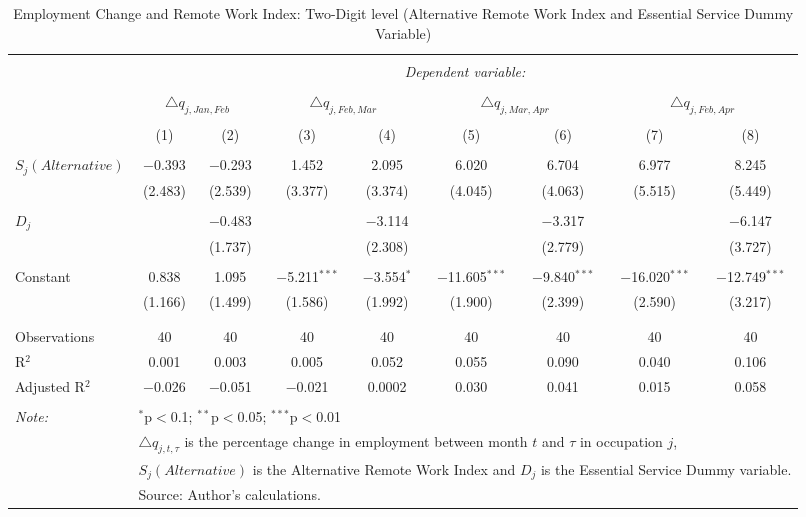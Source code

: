 
\begin{table}[!htbp] \centering 
  \caption{Employment Change and Remote Work Index: Two-Digit level (Alternative Remote Work Index and Essential Service Dummy Variable)} 
  \label{tab:regression_dynamics_2digit_alternative} 
\footnotesize 
\begin{tabular}{@{\extracolsep{5pt}}lcccccccc} 
\\[-1.8ex]\hline 
\hline \\[-1.8ex] 
 & \multicolumn{8}{c}{\textit{Dependent variable:}} \\ 
\cline{2-9} 
\\[-1.8ex] & \multicolumn{2}{c}{$\triangle q_{j,Jan,Feb}$} & \multicolumn{2}{c}{$\triangle q_{j,Feb,Mar}$} & \multicolumn{2}{c}{$\triangle q_{j,Mar,Apr}$} & \multicolumn{2}{c}{$\triangle q_{j,Feb,Apr}$} \\ 
\\[-1.8ex] & (1) & (2) & (3) & (4) & (5) & (6) & (7) & (8)\\ 
\hline \\[-1.8ex] 
 $S_{j} (Alternative)$ & $-$0.393 & $-$0.293 & 1.452 & 2.095 & 6.020 & 6.704 & 6.977 & 8.245 \\ 
  & (2.483) & (2.539) & (3.377) & (3.374) & (4.045) & (4.063) & (5.515) & (5.449) \\ 
  & & & & & & & & \\ 
 $D_{j}$ &  & $-$0.483 &  & $-$3.114 &  & $-$3.317 &  & $-$6.147 \\ 
  &  & (1.737) &  & (2.308) &  & (2.779) &  & (3.727) \\ 
  & & & & & & & & \\ 
 Constant & 0.838 & 1.095 & $-$5.211$^{***}$ & $-$3.554$^{*}$ & $-$11.605$^{***}$ & $-$9.840$^{***}$ & $-$16.020$^{***}$ & $-$12.749$^{***}$ \\ 
  & (1.166) & (1.499) & (1.586) & (1.992) & (1.900) & (2.399) & (2.590) & (3.217) \\ 
  & & & & & & & & \\ 
\hline \\[-1.8ex] 
Observations & 40 & 40 & 40 & 40 & 40 & 40 & 40 & 40 \\ 
R$^{2}$ & 0.001 & 0.003 & 0.005 & 0.052 & 0.055 & 0.090 & 0.040 & 0.106 \\ 
Adjusted R$^{2}$ & $-$0.026 & $-$0.051 & $-$0.021 & 0.0002 & 0.030 & 0.041 & 0.015 & 0.058 \\ 
\hline 
\hline \\[-1.8ex] 
\textit{Note:}  & \multicolumn{8}{l}{$^{*}$p$<$0.1; $^{**}$p$<$0.05; $^{***}$p$<$0.01} \\ 
 & \multicolumn{8}{l}{$\triangle q_{j,t,\tau}$ is the percentage change in employment between month $t$ and $\tau$ in occupation $j$,} \\ 
 & \multicolumn{8}{l}{$S_{j} (Alternative)$ is the Alternative Remote Work Index and $D_{j}$ is the Essential Service Dummy variable.} \\ 
 & \multicolumn{8}{l}{Source: Author's calculations.} \\ 
\end{tabular} 
\end{table} 
